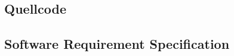 \documentclass[a4paper]{thesis}
\begin{document}
\subsection{Quellcode}

\paragraphmark{}
\subsection{Software Requirement Specification}
\hbox{\hskip -1cm}
\end{document}
